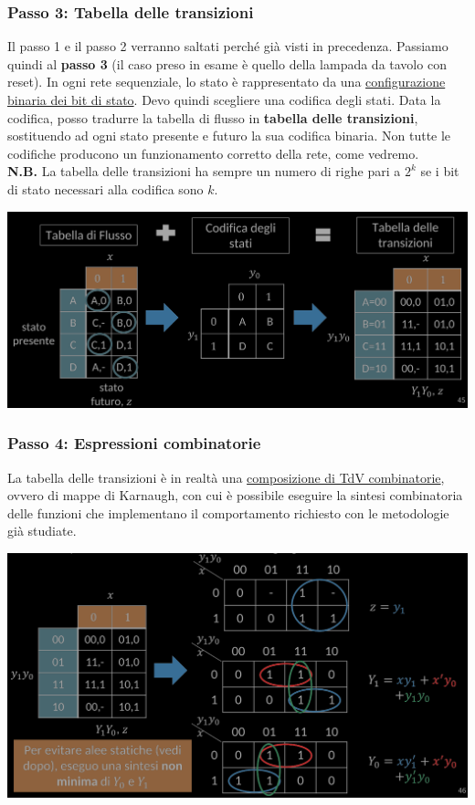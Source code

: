 \documentclass{article}
\begin{document}
\subsubsection*{Passo 3: Tabella delle transizioni}
Il passo 1 e il passo 2 verranno saltati perché già visti in precedenza. Passiamo quindi al \textbf{passo 3} (il caso preso in esame è quello della lampada da tavolo con reset).
In ogni rete sequenziale, lo stato è rappresentato da una \underline{configurazione binaria dei bit di stato}. Devo quindi scegliere una codifica degli stati. Data la codifica, posso tradurre la tabella di flusso in \textbf{\color{blue} tabella delle transizioni}, sostituendo ad ogni stato presente e futuro la sua codifica binaria. Non tutte le codifiche producono un funzionamento corretto della rete, come vedremo.\\
\textbf{N.B.} La tabella delle transizioni ha sempre un numero di righe pari a $2^k$ se i bit di stato necessari alla codifica sono $k$.
\begin{center}
    \includegraphics[scale=0.5]{passo3.png}
\end{center}
\subsubsection*{Passo 4: Espressioni combinatorie}
La tabella delle transizioni è in realtà una \underline{composizione di TdV combinatorie}, ovvero di mappe di Karnaugh, con cui è possibile eseguire la sintesi combinatoria delle funzioni che implementano il comportamento richiesto con le metodologie già studiate.
\begin{center}
    \includegraphics[scale=0.5]{passo4.png}
\end{center}
\end{document}
